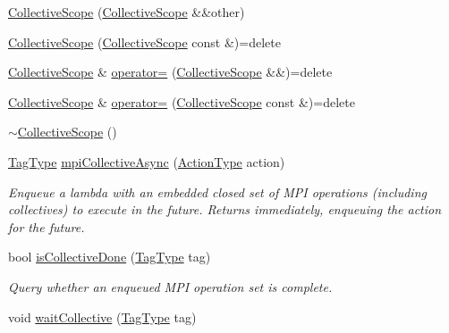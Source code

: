 \begin{DoxyCompactItemize}
\item 
\hyperlink{structvt_1_1collective_1_1_collective_scope_aef18868ea87dbbf5647c5575f86903a7}{Collective\+Scope} (\hyperlink{structvt_1_1collective_1_1_collective_scope}{Collective\+Scope} \&\&other)
\item 
\hyperlink{structvt_1_1collective_1_1_collective_scope_a9781b1b86796d271cc9407eb8034851f}{Collective\+Scope} (\hyperlink{structvt_1_1collective_1_1_collective_scope}{Collective\+Scope} const \&)=delete
\item 
\hyperlink{structvt_1_1collective_1_1_collective_scope}{Collective\+Scope} \& \hyperlink{structvt_1_1collective_1_1_collective_scope_a4a756e93437119e20a72dfe0d9ede190}{operator=} (\hyperlink{structvt_1_1collective_1_1_collective_scope}{Collective\+Scope} \&\&)=delete
\item 
\hyperlink{structvt_1_1collective_1_1_collective_scope}{Collective\+Scope} \& \hyperlink{structvt_1_1collective_1_1_collective_scope_ae211d02b75ae45834e25eb1cd8c2f7d0}{operator=} (\hyperlink{structvt_1_1collective_1_1_collective_scope}{Collective\+Scope} const \&)=delete
\item 
\hyperlink{structvt_1_1collective_1_1_collective_scope_a0b8d9664cdc7f94bed4b17e0eb5c2b77}{$\sim$\+Collective\+Scope} ()
\item 
\hyperlink{namespacevt_a84ab281dae04a52a4b243d6bf62d0e52}{Tag\+Type} \hyperlink{structvt_1_1collective_1_1_collective_scope_ad116d0b00f28b79dbf7c4b0e5c4ed4a1}{mpi\+Collective\+Async} (\hyperlink{namespacevt_ae0a5a7b18cc99d7b732cb4d44f46b0f3}{Action\+Type} action)
\begin{DoxyCompactList}\small\item\em Enqueue a lambda with an embedded closed set of M\+PI operations (including collectives) to execute in the future. Returns immediately, enqueuing the action for the future. \end{DoxyCompactList}\item 
bool \hyperlink{structvt_1_1collective_1_1_collective_scope_acc386201ec9e82dbe2691b4ce528a4c2}{is\+Collective\+Done} (\hyperlink{namespacevt_a84ab281dae04a52a4b243d6bf62d0e52}{Tag\+Type} tag)
\begin{DoxyCompactList}\small\item\em Query whether an enqueued M\+PI operation set is complete. \end{DoxyCompactList}\item 
void \hyperlink{structvt_1_1collective_1_1_collective_scope_afae2807ff3adc0f1d6772411168064f9}{wait\+Collective} (\hyperlink{namespacevt_a84ab281dae04a52a4b243d6bf62d0e52}{Tag\+Type} tag)

\end{DoxyCompactItemize}
